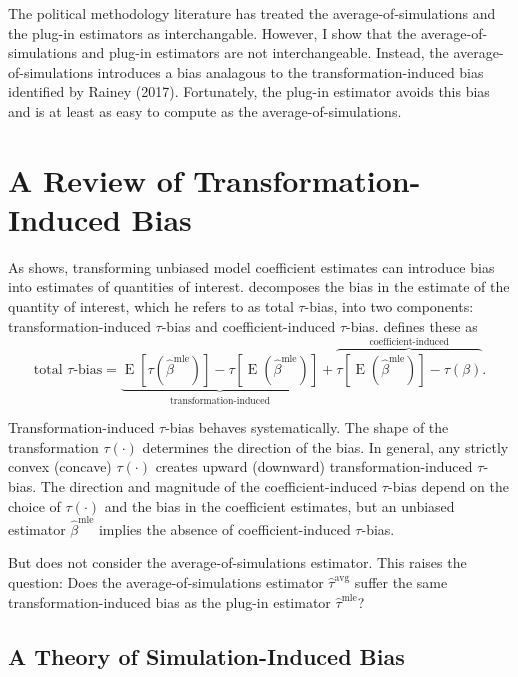 \documentclass[12pt]{article}
\DeclareMathOperator*{\E}{\text{E}}
\begin{document}
The political methodology literature has treated the average-of-simulations and the plug-in estimators as interchangable. However, I show that the average-of-simulations and plug-in estimators are not interchangeable. Instead, the average-of-simulations introduces a bias analagous to the transformation-induced bias identified by Rainey (2017). Fortunately, the plug-in estimator avoids this bias and is at least as easy to compute as the average-of-simulations.

\section*{A Review of Transformation-Induced Bias}

As \citet{Rainey2017} shows, transforming unbiased model coefficient estimates can introduce bias into estimates of quantities of interest. 
\citet[p.\@ 404]{Rainey2017} decomposes the bias in the estimate of the quantity of interest, which he refers to as {total $\tau$-bias,} into two components: transformation-induced $\tau$-bias and coefficient-induced $\tau$-bias. \citet{Rainey2017} defines these as
\begin{equation}
\text{total } \tau\text{-bias}= \underbrace{ \E\left[\tau\left(\hat{\beta}^\text{mle}\right)\right]-  \tau\left[\E\left(\hat{\beta}^\text{mle}\right)\right]  }_{\text{transformation-induced}} + \overbrace{  \tau\left[\E\left(\hat{\beta}^\text{mle}\right)\right] - \tau\left(\beta\right)  }^{\text{coefficient-induced}}\text{.} \label{eqn:ti-bias}
\end{equation}

Transformation-induced $\tau$-bias behaves systematically. 
The shape of the transformation $\tau(\cdot)$ determines the direction of the bias. 
In general, any strictly convex (concave) $\tau(\cdot)$ creates upward (downward) transformation-induced $\tau$-bias.
The direction and magnitude of the coefficient-induced $\tau$-bias depend on the choice of $\tau(\cdot)$ and the bias in the coefficient estimates, but an unbiased estimator $\hat{\beta}^\text{mle}$ implies the absence of coefficient-induced $\tau$-bias. 

But \cite{Rainey2017} does not consider the average-of-simulations estimator. 
This raises the question: Does the average-of-simulations estimator $\hat{\tau}^{\text{avg}}$ suffer the same transformation-induced bias as the plug-in estimator $\hat{\tau}^\text{mle}$?

\subsection*{A Theory of Simulation-Induced Bias}
\end{document}
